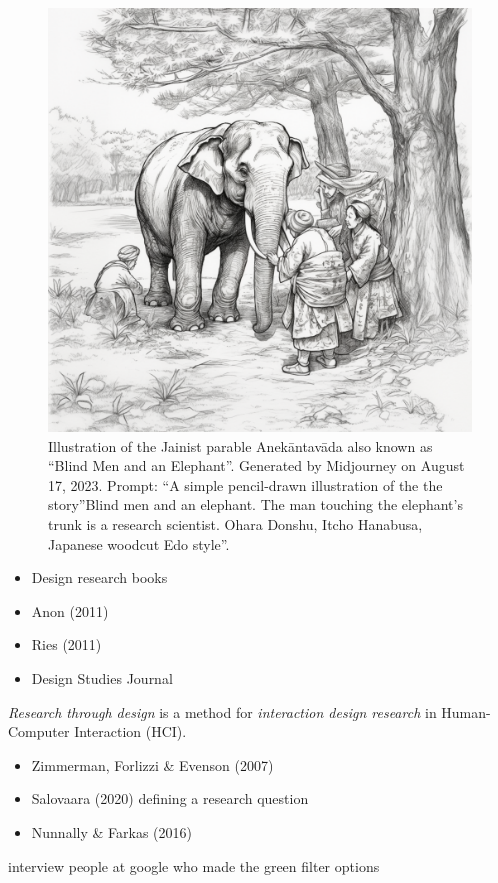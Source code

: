 \documentclass[
  letterpaper,
  DIV=11,
  numbers=noendperiod]{scrartcl}
\providecommand{\tightlist}{%
  \setlength{\itemsep}{0pt}\setlength{\parskip}{0pt}}\usepackage{longtable,booktabs,array}
\begin{document}
\begin{figure}[H]

{\centering \includegraphics[width=0.6\linewidth,height=\textheight,keepaspectratio]{./images/discussion/elephant.png}

}

\caption{Illustration of the Jainist parable Anekāntavāda also known as
``Blind Men and an Elephant''. Generated by Midjourney on August 17,
2023. Prompt: ``A simple pencil-drawn illustration of the the
story''Blind men and an elephant. The man touching the elephant's trunk
is a research scientist. Ohara Donshu, Itcho Hanabusa, Japanese woodcut
Edo style''.}

\end{figure}%

\begin{itemize}
\tightlist
\item
  Design research books
\item
  Anon (2011)
\item
  Ries (2011)
\item
  Design Studies Journal
\end{itemize}

\emph{Research through design} is a method for \emph{interaction design
research} in Human-Computer Interaction (HCI).

\begin{itemize}
\item
  Zimmerman, Forlizzi \& Evenson (2007)
\item
  Salovaara (2020) defining a research question
\item
  Nunnally \& Farkas (2016)
\end{itemize}

interview people at google who made the green filter options
\end{document}
